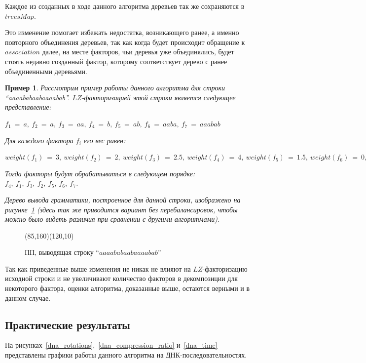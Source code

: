 \documentclass[12pt,a4paper]{extarticle}
\theoremstyle{break}
\newtheorem{example}{Пример}
\begin{document}
Каждое из созданных в ходе данного алгоритма деревьев так же сохраняются в
$treesMap$. 

Это изменение помогает избежать недостатка, возникающего ранее, а именно
повторного объединения деревьев, так как когда будет происходит
обращение к $association$ далее, на месте факторов, чьи деревья уже
объединялись, будет стоять недавно созданный фактор, которому соответствует
дерево с ранее объединенными деревьями.

\begin{example}
Рассмотрим пример работы данного алгоритма для строки ``aaaababaabaaaabab''.
$LZ$-факторизацией этой строки является следующее представление:
\begin{center}
$f_1\ =\ a,\ f_2\ =\ a,\ f_3\ =\ aa,\ f_4\ =\ b,\ f_5\ =\ ab,\ f_6\ =\ aaba,\
f_7\ =\ aaabab$
\end{center}
Для каждого фактора $f_i$ его вес равен:
\begin{center}
$weight(f_1)\ =\ 3,\ weight(f_2)\ =\ 2,\ weight(f_3)\ =\ 2.5,\ weight(f_4)\ =\
4,\ weight(f_5)\ =\ 1.5,\ weight(f_6)\ =\ 0,\ weight(f_7)\ =\ 0$
\end{center}
Тогда факторы будут обрабатываться в следующем порядке: $f_4,\ f_1,\
f_3,\ f_2,\ f_5,\ f_6,\ f_7$.

Дерево вывода грамматики, построенное для данной строки, изображено на
рисунке~\ref{lazyhslp} (здесь так же приводится вариант без перебалансировок,
чтобы можно было видеть различия при сравнении с другими алгоритмами).
\end{example}

\begin{figure}[!h]
    \begin{center}
        \begin{picture}(85,160)(120,10)
            \picLazyHeuristic
        \end{picture}
    \end{center}
    \caption{ПП, выводящая строку ``$aaaababaabaaaabab$''}
    \label{lazyhslp}
\end{figure}

Так как приведенные выше изменения не никак не влияют на $LZ$-факторизацию
исходной строки и не увеличивают количество факторов в декомпозиции для
некоторого фактора, оценки алгоритма, доказанные выше, остаются верными и в данном случае.

\newpage 
\subsection{Практические результаты}
На рисунках~\ref{dna_rotations},~\ref{dna_compression_ratio} и~\ref{dna_time} 
представлены графики работы данного алгоритма на ДНК-последовательностях.
\end{document}
